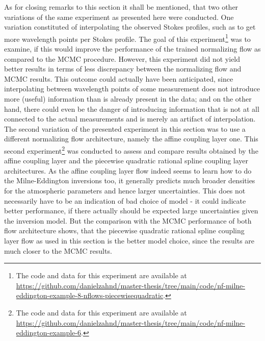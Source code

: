 \documentclass[a4paper,12pt]{report}
\def\lk#1{{\color{black}{#1}}}
\begin{document}
As for closing remarks to this section it shall be mentioned, that two other variations of the same experiment as presented here were conducted. One variation constituted of interpolating the observed Stokes profiles, such as to get more wavelength points per Stokes profile. The goal of this experiment\footnote{The code and data for this experiment are available at \url{https://github.com/danielzahnd/master-thesis/tree/main/code/nf-milne-eddington-example-8-nflows-piecewisequadratic}.} was to examine, if this would improve the performance of the trained normalizing flow as compared to the MCMC procedure. However, this experiment did not yield better results in terms of less discrepancy between the normalizing flow and MCMC results. This outcome could actually have been anticipated, since interpolating between wavelength points of some measurement does not introduce more (useful) information than is already present in the data; and on the other hand, there could even be the danger of introducing information that is not at all connected to the actual measurements and is merely an artifact of interpolation. The second variation of the presented experiment in this section was to use a different normalizing flow architecture, namely the affine coupling layer one. This second experiment\footnote{The code and data for this experiment are available at \url{https://github.com/danielzahnd/master-thesis/tree/main/code/nf-milne-eddington-example-6}.} was conducted to assess and compare results obtained by the affine coupling layer and the piecewise quadratic rational spline coupling layer architectures. As the affine coupling layer flow indeed seems to learn how to do the Milne-Eddington inversions too, it generally predicts much broader densities for the atmospheric parameters and hence larger uncertainties. This does not necessarily have to be an indication of bad choice of model - it could indicate better performance, if there actually should be expected large uncertainties given the inversion model. But the comparison with the MCMC performance of both flow architecture shows, that the piecewise quadratic rational spline coupling layer flow as used in this section is the better model choice, since the results are much closer to the MCMC results. \lk{Furthermore, piecewise rational quadratic spline coupling layer flows are the better a priori model choice for stellar inversions, because affine coupling layer flows experience difficulties with modeling multimodal densities as they are to be expected from inversions.}

\FloatBarrier
\end{document}
